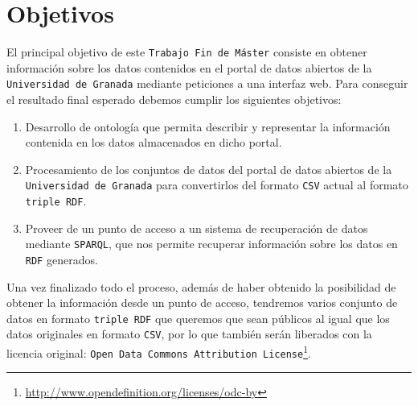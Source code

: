 \chapter{Objetivos}

El principal objetivo de este {\tt Trabajo Fin de Máster} consiste en obtener información sobre los datos contenidos en el portal de datos abiertos de la {\tt Universidad de Granada} mediante peticiones a una interfaz web. Para conseguir el resultado final esperado debemos cumplir los siguientes objetivos:

\begin{enumerate}
	\item Desarrollo de ontología que permita describir y representar la información contenida en los datos almacenados en dicho portal.
	\item Procesamiento de los conjuntos de datos del portal de datos abiertos de la {\tt Universidad de Granada} para convertirlos del formato {\tt CSV} actual al formato {\tt triple RDF}.
	\item Proveer de un punto de acceso a un sistema de recuperación de datos mediante {\tt SPARQL}, que nos permite recuperar información sobre los datos en {\tt RDF} generados.
\end{enumerate}

Una vez finalizado todo el proceso, además de haber obtenido la posibilidad de obtener la información desde un punto de acceso, tendremos varios conjunto de datos en formato {\tt triple RDF} que queremos que sean públicos al igual que los datos originales en formato {\tt CSV}, por lo que también serán liberados con la licencia original: {\tt Open Data Commons Attribution License}\footnote{\url{http://www.opendefinition.org/licenses/odc-by}}.